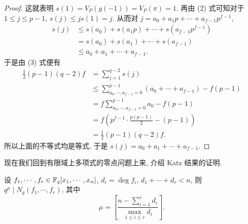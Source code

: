 \begin{proof}
这就表明 $s(1)=V_P(g(-1))=V_P(\pi)=1$. 再由 (2) 式可知对于 $1\leqslant j\leqslant p-1$, $s(j)\leqslant js(1)=j$. 从而对 $j=a_0+a_1p+\cdots+a_{f-1}p^{f-1}$,
\begin{align*}
  s(j)&\leqslant s(a_0)+s(a_1p)+\cdots+s(a_{f-1}p^{f-1})\\
  &=s(a_0)+s(a_1)+\cdots+s(a_{f-1})\\
  &\leqslant a_0+a_1+\cdots+a_{f-1}.
\end{align*}
于是由 (3) 式便有
\begin{align*}
  \frac{1}{2}(p-1)(q-2)f&=\sum_{j=1}^{q-2}s(j)\\
  &\leqslant\sum_{a_0,\cdots,a_{f-1}=0}^{p-1}(a_0+\cdots+a_{f-1})-f(p-1)\\
  &=f\sum_{a_0,\cdots,a_{f-1}=0}^{p-1}a_0-f(p-1)\\
  &=f\left(p^{f-1}\cdot\frac{p(p-1)}{2}-(p-1)\right)\\
  &=\frac{1}{2}(p-1)(q-2)f.
\end{align*}
所以上面的不等式均是等式, 于是 $s(j)=a_0+a_1+\cdots+a_{f-1}$.
\end{proof}

现在我们回到有限域上多项式的零点问题上来, 介绍 Katz 结果的证明.

\begin{theorem}\label{thm:9.7}
设 $f_1,\cdots,f_r\in\mathbb{F}_q[x_1,\cdots,x_n]$, $d_i=\deg f_i$, $d_1+\cdots+d_r<n$, 则 $q^{\mu}\mid N_q(f_1,\cdots,f_r)$, 其中
\[
  \mu=\left[\frac{n-\sum_{i=1}^{r}d_i}{\max\limits_{1\leqslant i\leqslant r}d_i}\right].
\]
\end{theorem}

